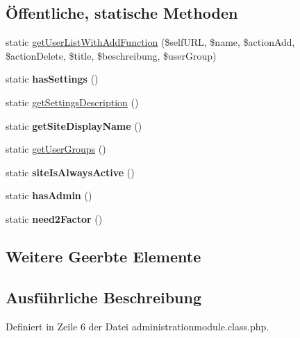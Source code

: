 \subsection*{Öffentliche, statische Methoden}
\begin{DoxyCompactItemize}
\item 
static \mbox{\hyperlink{classadministrationmodule_ad511d7c0e5be0c6d257c396f1c1c54df}{get\+User\+List\+With\+Add\+Function}} (\$self\+U\+RL, \$name, \$action\+Add, \$action\+Delete, \$title, \$beschreibung, \$user\+Group)
\item 
\mbox{\label{classadministrationmodule_a1babbdc7abbff23dc16e377cf2fdde76}} 
static {\bfseries has\+Settings} ()
\item 
static \mbox{\hyperlink{classadministrationmodule_ab1155eaf2fecbdd7e5be823a1577f97e}{get\+Settings\+Description}} ()
\item 
\mbox{\label{classadministrationmodule_adcb5f5f9d40b8c280bdde14aab3e73d8}} 
static {\bfseries get\+Site\+Display\+Name} ()
\item 
static \mbox{\hyperlink{classadministrationmodule_a3385151fee17c9aa7cb6c16f50d28d10}{get\+User\+Groups}} ()
\item 
\mbox{\label{classadministrationmodule_a9e450810729b43d11babb999ad09c446}} 
static {\bfseries site\+Is\+Always\+Active} ()
\item 
\mbox{\label{classadministrationmodule_a6236a4a8b67f6ea6ce6c99ae5b90c316}} 
static {\bfseries has\+Admin} ()
\item 
\mbox{\label{classadministrationmodule_a90782ee49a541ba8f6aa760d55005025}} 
static {\bfseries need2\+Factor} ()
\end{DoxyCompactItemize}
\subsection*{Weitere Geerbte Elemente}


\subsection{Ausführliche Beschreibung}


Definiert in Zeile 6 der Datei administrationmodule.\+class.\+php.



